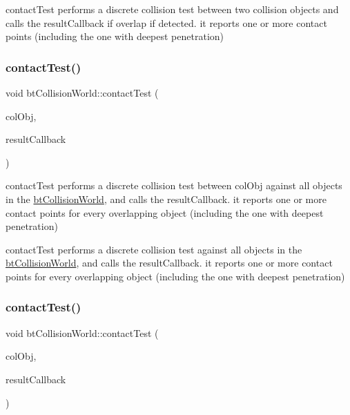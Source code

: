 contact\+Test performs a discrete collision test between two collision objects and calls the result\+Callback if overlap if detected. it reports one or more contact points (including the one with deepest penetration) \mbox{\label{classbtCollisionWorld_ae1d167b53de82d4f97a47118f8480999}} 
\subsubsection{\texorpdfstring{contact\+Test()}{contactTest()}\hspace{0.1cm}{\footnotesize\ttfamily [1/2]}}
{\footnotesize\ttfamily void bt\+Collision\+World\+::contact\+Test (\begin{DoxyParamCaption}\item[{bt\+Collision\+Object $\ast$}]{col\+Obj,  }\item[{\hyperlink{structbtCollisionWorld_1_1ContactResultCallback}{Contact\+Result\+Callback} \&}]{result\+Callback }\end{DoxyParamCaption})}

contact\+Test performs a discrete collision test between col\+Obj against all objects in the \hyperlink{classbtCollisionWorld}{bt\+Collision\+World}, and calls the result\+Callback. it reports one or more contact points for every overlapping object (including the one with deepest penetration)

contact\+Test performs a discrete collision test against all objects in the \hyperlink{classbtCollisionWorld}{bt\+Collision\+World}, and calls the result\+Callback. it reports one or more contact points for every overlapping object (including the one with deepest penetration) \mbox{\label{classbtCollisionWorld_ae1d167b53de82d4f97a47118f8480999}} 
\subsubsection{\texorpdfstring{contact\+Test()}{contactTest()}\hspace{0.1cm}{\footnotesize\ttfamily [2/2]}}
{\footnotesize\ttfamily void bt\+Collision\+World\+::contact\+Test (\begin{DoxyParamCaption}\item[{bt\+Collision\+Object $\ast$}]{col\+Obj,  }\item[{\hyperlink{structbtCollisionWorld_1_1ContactResultCallback}{Contact\+Result\+Callback} \&}]{result\+Callback }\end{DoxyParamCaption})}

